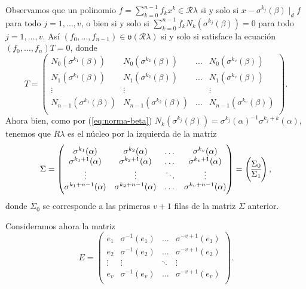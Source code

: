 Observamos que un polinomio \(f = \sum_{k = 0}^{n-1}f_k x^{k} \in \mathcal R\lambda\) si y solo si \(x - \sigma^{k_j}(\beta) \mid_d f\) para todo \(j = 1, \dots, v\), o bien si y solo si \(\sum_{k=0}^{n -1}f_k N_k(\sigma^{k_j}(\beta))= 0\) para todo \(j = 1, \dots, v\).
Así \((f_0, \dots, f_{n-1}) \in \mathfrak v(\mathcal R\lambda)\) si y solo si satisface la ecuación \((f_0, \dots, f_n)T = 0\), donde
\[
  T = \begin{pmatrix}
    N_{0}(\sigma^{k_1}(\beta)) & N_{0}(\sigma^{k_2}(\beta)) & \dots & N_{0}(\sigma^{k_v}(\beta))\\
    N_{1}(\sigma^{k_1}(\beta)) & N_{1}(\sigma^{k_2}(\beta)) & \dots & N_{1}(\sigma^{k_v}(\beta))\\
    \vdots & \vdots & & \vdots\\
    N_{n-1}(\sigma^{k_1}(\beta)) & N_{n-1}(\sigma^{k_2}(\beta)) & \dots & N_{n-1}(\sigma^{k_v}(\beta))\\
  \end{pmatrix}.
\]
Ahora bien, como por (\ref{eq:norma-beta}) \(N_k(\sigma^{k_j}(\beta)) = \sigma^{k_j}(\alpha)^{-1}\sigma^{k_j + k}(\alpha)\), tenemos que \(R\lambda\) es el núcleo por la izquierda de la matriz
\[
  \Sigma = \begin{pmatrix}
    \sigma^{k_1}(\alpha) & \sigma^{k_2}(\alpha) & \dots & \sigma^{k_v}(\alpha)\\
    \sigma^{k_1 + 1}(\alpha) & \sigma^{k_2 + 1}(\alpha) & \dots & \sigma^{k_v + 1}(\alpha)\\
    \vdots & \vdots & \ddots & \vdots \\
    \sigma^{k_1 + n - 1}(\alpha) & \sigma^{k_2 + n - 1}(\alpha) & \dots & \sigma^{k_v + n - 1}(\alpha)\\
  \end{pmatrix}
  = \left( \begin{array}{@{}c@{}}
    \Sigma_0\\\hline
    \Sigma_1
  \end{array}\right),
\]
donde \(\Sigma_0\) se corresponde a las primeras \(v + 1\) filas de la matriz \(\Sigma\) anterior.

Consideramos ahora la matriz 
\[
  E = \begin{pmatrix}
    e_1 & \sigma^{-1}(e_1) & \dots & \sigma^{-v + 1}(e_1)\\
    e_2 & \sigma^{-1}(e_2) & \dots & \sigma^{-v + 1}(e_2)\\
    \vdots & \vdots & \ddots & \vdots \\
    e_v & \sigma^{-1}(e_v) & \dots & \sigma^{-v + 1}(e_v)\\
  \end{pmatrix}.
\]

